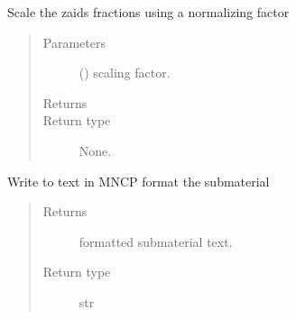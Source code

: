 \documentclass[letterpaper,10pt,english]{sphinxmanual}
\begin{document}
\begin{fulllineitems}
\begin{fulllineitems}
\begin{quote}
\begin{description}
\begin{itemize}
\end{itemize}


\end{description}\end{quote}

\end{fulllineitems}


\begin{fulllineitems}
\label{\detokenize{api/inputgeneration:matreader.SubMaterial.scale_fractions}}
Scale the zaids fractions using a normalizing factor
\begin{quote}\begin{description}
\item[{Parameters}] \leavevmode
{} () \textendash{} scaling factor.

\item[{Returns}] \leavevmode


\item[{Return type}] \leavevmode
None.

\end{description}\end{quote}

\end{fulllineitems}


\begin{fulllineitems}
\label{\detokenize{api/inputgeneration:matreader.SubMaterial.to_text}}
Write to text in MNCP format the submaterial
\begin{quote}\begin{description}
\item[{Returns}] \leavevmode
formatted submaterial text.

\item[{Return type}] \leavevmode
str

\end{description}\end{quote}


\end{fulllineitems}
\end{fulllineitems}
\end{document}
